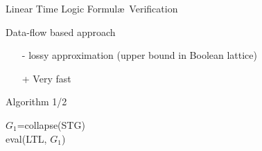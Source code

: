 \newcommand{\lub}{\ensuremath{\sqcup}\xspace}
\newcommand{\Lub}{\ensuremath{\bigsqcup}\xspace}
\newcommand{\state}{\ensuremath{\mathit{s}}\xspace}
\newcommand{\STG}{\ensuremath{\mathrm{STG}}\xspace}
\newcommand{\States}{\ensuremath{\mathit{States}}\xspace}
\newcommand{\prop}[1]{\ensuremath{p_{\state,#1}}\xspace} 
\newcommand{\propp}[1]{\ensuremath{p_{\state',#1}}\xspace} 
\newcommand{\G}{\ensuremath{\mathrm{G}}\xspace}
\newcommand{\F}{\ensuremath{\mathrm{F}}\xspace}
\newcommand{\X}{\ensuremath{\mathrm{X}}\xspace}
\newcommand{\R}{\ensuremath{\mathrm{R}}\xspace}
\newcommand{\U}{\ensuremath{\mathrm{U}}\xspace}
\newcommand{\WU}{\ensuremath{\mathrm{WU}\xspace}}
\newcommand{\comb}{\ensuremath{\mathit{joined\_succs}}\xspace}


\begin{frame}{Linear Time Logic Formul\ae\ Verification}

  \begin{block}{Data-flow based approach}
    \begin{itemize}
    \item[-] lossy approximation (upper bound in Boolean lattice)
    \item[+] Very fast
    \end{itemize}
  \end{block}

  \begin{block}{Algorithm 1/2}
    \footnotesize
    \begin{algorithm}[H]
      \SetLine

      $G_1$=collapse(STG) \\
      eval(LTL, $G_1$) 
    \end{algorithm}
  \end{block}
\end{frame}

